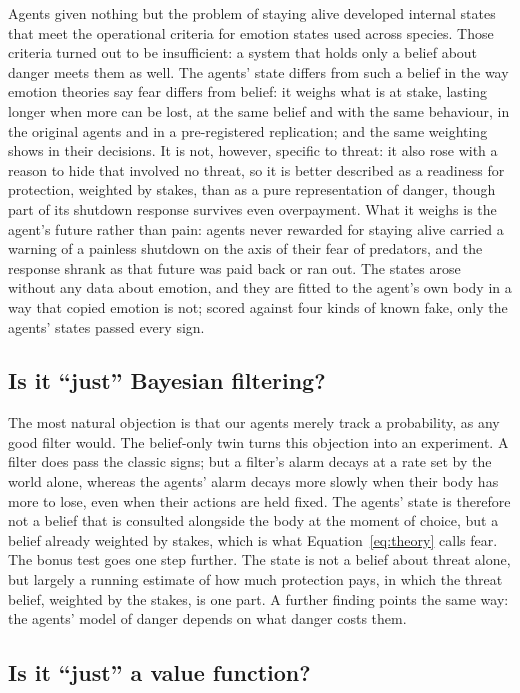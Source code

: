 \documentclass[11pt]{article}
\begin{document}
Agents given nothing but the problem of staying alive developed internal states that meet the operational criteria for emotion states used across species. Those criteria turned out to be insufficient: a system that holds only a belief about danger meets them as well. The agents' state differs from such a belief in the way emotion theories say fear differs from belief: it weighs what is at stake, lasting longer when more can be lost, at the same belief and with the same behaviour, in the original agents and in a pre-registered replication; and the same weighting shows in their decisions. It is not, however, specific to threat: it also rose with a reason to hide that involved no threat, so it is better described as a readiness for protection, weighted by stakes, than as a pure representation of danger, though part of its shutdown response survives even overpayment. What it weighs is the agent's future rather than pain: agents never rewarded for staying alive carried a warning of a painless shutdown on the axis of their fear of predators, and the response shrank as that future was paid back or ran out. The states arose without any data about emotion, and they are fitted to the agent's own body in a way that copied emotion is not; scored against four kinds of known fake, only the agents' states passed every sign.

\subsection{Is it ``just'' Bayesian filtering?}

The most natural objection is that our agents merely track a probability, as any good filter would. The belief-only twin turns this objection into an experiment. A filter does pass the classic signs; but a filter's alarm decays at a rate set by the world alone, whereas the agents' alarm decays more slowly when their body has more to lose, even when their actions are held fixed. The agents' state is therefore not a belief that is consulted alongside the body at the moment of choice, but a belief already weighted by stakes, which is what Equation~\ref{eq:theory} calls fear. The bonus test goes one step further. The state is not a belief about threat alone, but largely a running estimate of how much protection pays, in which the threat belief, weighted by the stakes, is one part. A further finding points the same way: the agents' model of danger depends on what danger costs them.

\subsection{Is it ``just'' a value function?}
\end{document}
